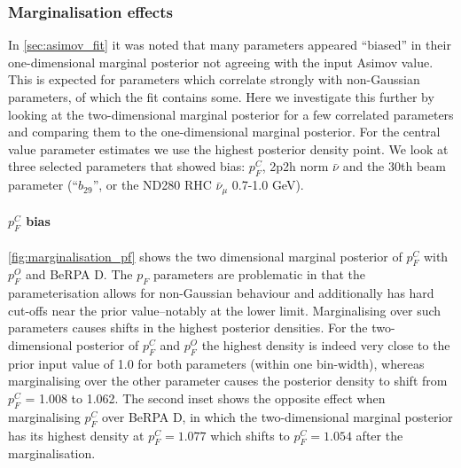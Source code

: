 \subsubsection{Marginalisation effects}
\label{sec:marginalisation}
In \autoref{sec:asimov_fit} it was noted that many parameters appeared ``biased'' in their one-dimensional marginal posterior not agreeing with the input Asimov value. This is expected for parameters which correlate strongly with non-Gaussian parameters, of which the fit contains some. Here we investigate this further by looking at the two-dimensional marginal posterior for a few correlated parameters and comparing them to the one-dimensional marginal posterior. For the central value parameter estimates we use the highest posterior density point. We look at three selected parameters that showed bias: $p_F^{C}$, 2p2h norm $\bar{\nu}$ and the 30th beam parameter (``$b_29$'', or the ND280 RHC $\bar{\nu}_\mu$ 0.7-1.0 GeV).

\paragraph{$p_F^C$ bias}
\autoref{fig:marginalisation_pf} shows the two dimensional marginal posterior of $p_F^C$ with $p_F^O$ and BeRPA D. The $p_F$ parameters are problematic in that the parameterisation  allows for non-Gaussian behaviour and additionally has hard cut-offs near the prior value--notably at the lower limit. Marginalising over such parameters causes shifts in the highest posterior densities. For the two-dimensional posterior of $p_F^C$ and $p_F^O$ the highest density is indeed very close to the prior input value of 1.0 for both parameters (within one bin-width), whereas marginalising over the other parameter causes the posterior density to shift from $p_F^{C}$ = 1.008 to 1.062. The second inset shows the opposite effect when marginalising $p_F^{C}$ over BeRPA D, in which the two-dimensional marginal posterior has its highest density at $p_F^{C} = 1.077$ which shifts to $p_F^{C} = 1.054$ after the marginalisation.

